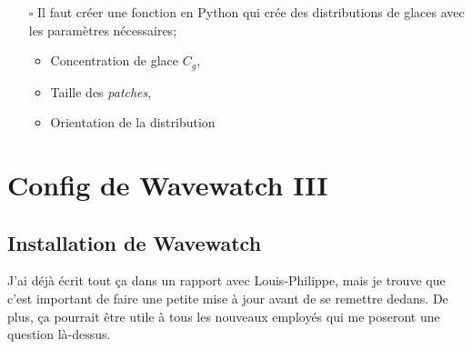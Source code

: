 \documentclass[10pt]{article}
\numberwithin{equation}{section}
\begin{document}
\begin{itemize}
\item[{$\square$}] Il faut créer une fonction en Python qui crée des distributions de glaces avec les paramètres nécessaires;
\begin{itemize}
\item Concentration de glace \(C_g\),
\item Taille des \emph{patches},
\item Orientation de la distribution
\end{itemize}
\end{itemize}
\section{Config de Wavewatch III}
\label{sec:org4c4df03}

\subsection{Installation de Wavewatch}
\label{sec:orge67bc0a}

J'ai déjà écrit tout ça dans un rapport avec Louis-Philippe, mais je trouve que c'est important de faire une petite mise à jour avant de se remettre dedans. De plus, ça pourrait être utile à tous les nouveaux employés qui me poseront une question là-dessus.
\end{document}
